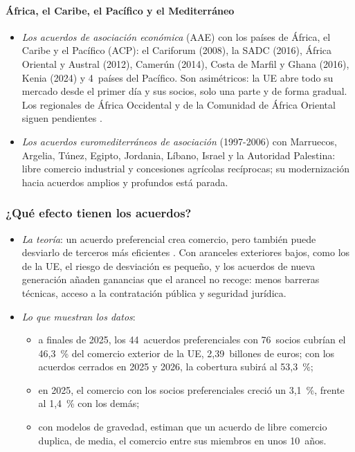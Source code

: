 \documentclass[11pt]{article}
\begin{document}
\paragraph{África, el Caribe, el Pacífico y el Mediterráneo}

\begin{itemize}
\item \emph{Los acuerdos de asociación económica} (AAE) con los países de África, el Caribe y el Pacífico (ACP): el Cariforum (2008), la SADC (2016), África Oriental y Austral (2012), Camerún (2014), Costa de Marfil y Ghana (2016), Kenia (2024) y 4~países del Pacífico. Son asimétricos: la UE abre todo su mercado desde el primer día y sus socios, solo una parte y de forma gradual. Los regionales de África Occidental y de la Comunidad de África Oriental siguen pendientes .
\item \emph{Los acuerdos euromediterráneos de asociación} (1997-2006) con Marruecos, Argelia, Túnez, Egipto, Jordania, Líbano, Israel y la Autoridad Palestina: libre comercio industrial y concesiones agrícolas recíprocas; su modernización hacia acuerdos amplios y profundos está parada.
\end{itemize}
\subsubsection{¿Qué efecto tienen los acuerdos?}\label{sec:efectos}

\begin{itemize}
\item \emph{La teoría}: un acuerdo preferencial crea comercio, pero también puede desviarlo de terceros más eficientes . Con aranceles exteriores bajos, como los de la UE, el riesgo de desviación es pequeño, y los acuerdos de nueva generación añaden ganancias que el arancel no recoge: menos barreras técnicas, acceso a la contratación pública y seguridad jurídica.
\item \emph{Lo que muestran los datos}:
  \begin{itemize}
  \item a finales de 2025, los 44~acuerdos preferenciales con 76~socios cubrían el 46,3~\% del comercio exterior de la UE, 2,39~billones de euros; con los acuerdos cerrados en 2025 y 2026, la cobertura subirá al 53,3~\%\nocite{CE2026Informe};
  \item en 2025, el comercio con los socios preferenciales creció un 3,1~\%, frente al 1,4~\% con los demás;
  \item con modelos de gravedad, \textcite{BaierBergstrand2007} estiman que un acuerdo de libre comercio duplica, de media, el comercio entre sus miembros en unos 10~años.
  \end{itemize}
\end{itemize}
\end{document}
